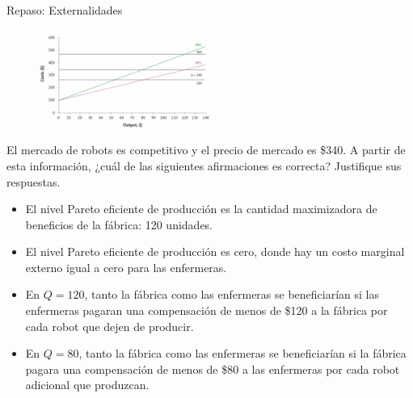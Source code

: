 \documentclass{beamer}
\begin{document}
\begin{frame}{Repaso: Externalidades}
    \scriptsize

    \begin{figure}[h!]
        \centering
        \includegraphics[width=0.5\textwidth]{../Figures/Externalidades_Ejercicio.png}
    \end{figure}

    El mercado de robots es competitivo y el precio de mercado es \$340. A partir de esta información, ¿cuál de las siguientes afirmaciones es correcta? Justifique sus respuestas.
    \begin{itemize}
        \item El nivel Pareto eficiente de producción es la cantidad maximizadora de beneficios de la fábrica: 120 unidades.
        \item El nivel Pareto eficiente de producción es cero, donde hay un costo marginal externo igual a cero para las enfermeras. 
        \item En \(Q = 120\), tanto la fábrica como las enfermeras se beneficiarían si las enfermeras pagaran una compensación de menos de \$120 a la fábrica por cada robot que dejen de producir.
        \item En \(Q = 80\), tanto la fábrica como las enfermeras se beneficiarían si la fábrica pagara una compensación de menos de \$80 a las enfermeras por cada robot adicional que produzcan.
    \end{itemize}

\end{frame}
\end{document}
